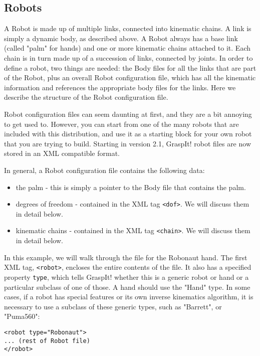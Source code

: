 \subsection{Robots}
\label{sec:robotfile}

A Robot is made up of multiple links, connected into kinematic
chains. A link is simply a dynamic body, as described above. A Robot
always has a base link (called "palm" for hands) and one or more
kinematic chains attached to it. Each chain is in turn made up of a
succession of links, connected by joints. In order to define a robot,
two things are needed: the Body files for all the links that are part
of the Robot, plus an overall Robot configuration file, which has all
the kinematic information and references the appropriate body files
for the links. Here we describe the structure of the Robot
configuration file.

Robot configuration files can seem daunting at first, and they are a
bit annoying to get used to. However, you can start from one of the
many robots that are included with this distribution, and use it as a
starting block for your own robot that you are trying to
build. Starting in version 2.1, GraspIt! robot files are now stored in
an XML compatible format.

In general, a Robot configuration file contains the following data:
\begin{itemize}
\item the palm - this is simply a pointer to the Body file that
  contains the palm.
\item{degrees of freedom} - contained in the XML tag
  \texttt{\texttt{<dof>}}. We will discuss them in detail below.
\item{kinematic chains} - contained in the XML tag
  \texttt{\texttt{<chain>}}. We will discuss them in detail below.
\end{itemize}

In this example, we will walk through the file for the Robonaut
hand. The first XML tag, \texttt{\texttt{<robot>}}, encloses the entire
contents of the file. It also has a specified property \texttt{type},
which tells GraspIt! whether this is a generic robot or hand or a
particular subclass of one of those. A hand should use the "Hand"
type. In some cases, if a robot has special features or its own
inverse kinematics algorithm, it is necessary to use a subclass of
these generic types, such as "Barrett", or "Puma560":

\begin{verbatim}
<robot type="Robonaut">
... (rest of Robot file)
</robot>
\end{verbatim}

